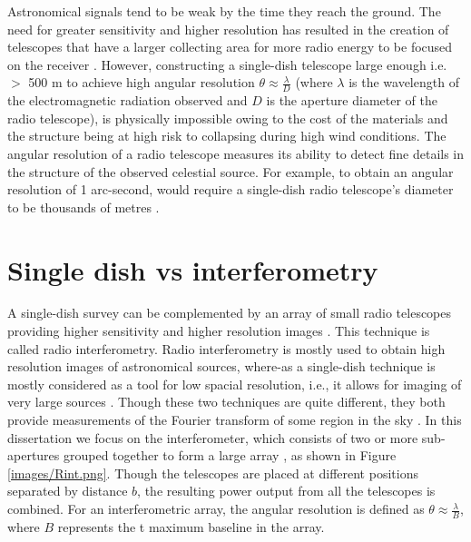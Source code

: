 Astronomical signals tend to be weak by the time they reach the ground. The need for greater sensitivity and higher resolution has resulted in the creation of telescopes that have a larger collecting area for more radio energy to be focused on the receiver \citep{verschuur2015invisible}. However, constructing a single-dish telescope large enough i.e. $>$ 500 $\mathrm{m}$ to achieve high angular resolution $\theta \approx\frac{\lambda}{D}$ (where $\lambda$ is the wavelength of the electromagnetic radiation observed and $D$ is the aperture diameter of the radio telescope), is physically impossible owing to the cost of the materials and the structure being at high risk to collapsing during high wind conditions. The angular resolution of a radio telescope measures its ability to detect fine details in the structure of the observed celestial source. For example, to obtain an angular resolution of 1 arc-second, would require a single-dish radio telescope's diameter to be thousands of metres \citep{verschuur2015invisible}. 

\section{Single dish vs interferometry}
\label{RvI}


A single-dish survey can be complemented by an array of small radio telescopes providing higher sensitivity and higher resolution images  \citep{thompson2001interferometry}. This technique is called radio interferometry. Radio interferometry is mostly used to obtain high resolution images of astronomical sources, where-as a single-dish technique is mostly considered as a tool for low spacial resolution, i.e., it allows for imaging of very large sources \citep{thompson2001interferometry}. Though these two techniques are quite different, they both provide measurements of the Fourier transform of  some region in the sky \citep{cornwell1988radio}. In this dissertation we focus on the interferometer, which consists of two or more sub-apertures grouped together to form a large array \citep{verschuur2015invisible}, as shown in Figure \ref{images/Rint.png}. Though the telescopes are placed at different positions separated by distance $b$, the resulting power output from all the telescopes is combined. For an interferometric array, the angular resolution is defined as  $\theta \approx\frac{\lambda}{B}$, where $B$ represents the t maximum baseline in the array. 

